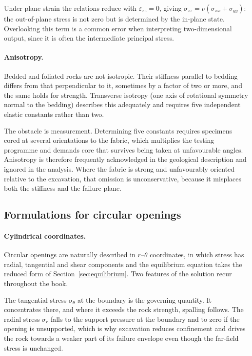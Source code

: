 Under plane strain the relations reduce with $\varepsilon_{zz}=0$, giving
$\sigma_{zz} = \nu(\sigma_{xx}+\sigma_{yy})$: the out-of-plane stress is not
zero but is determined by the in-plane state. Overlooking this term is a
common error when interpreting two-dimensional output, since it is often the
intermediate principal stress.

\paragraph{Anisotropy.}
Bedded and foliated rocks are not isotropic. Their stiffness parallel to
bedding differs from that perpendicular to it, sometimes by a factor of two or
more, and the same holds for strength. Transverse isotropy (one axis of
rotational symmetry normal to the bedding) describes this adequately and
requires five independent elastic constants rather than two.

The obstacle is measurement. Determining five constants requires specimens
cored at several orientations to the fabric, which multiplies the testing
programme and demands core that survives being taken at unfavourable angles.
Anisotropy is therefore frequently acknowledged in the geological description
and ignored in the analysis. Where the fabric is strong and unfavourably
oriented relative to the excavation, that omission is unconservative, because
it misplaces both the stiffness and the failure plane.

\subsection{Formulations for circular openings}
\label{sec:formulations-for-circular-openings}

\paragraph{Cylindrical coordinates.}
Circular openings are naturally described in $r$--$\theta$ coordinates, in
which stress has radial, tangential and shear components and the equilibrium
equation takes the reduced form of Section~\ref{sec:equilibrium}. Two features of the solution
recur throughout the book.

The tangential stress $\sigma_\theta$ at the boundary is the governing
quantity. It concentrates there, and where it exceeds the rock strength,
spalling follows. The radial stress $\sigma_r$ falls to the support pressure
at the boundary and to zero if the opening is unsupported, which is why
excavation reduces confinement and drives the rock towards a weaker part of
its failure envelope even though the far-field stress is unchanged.

